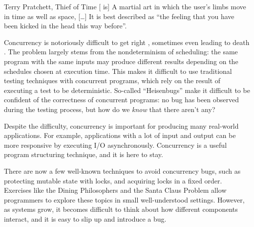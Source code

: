 \begin{chapquote}{Terry Pratchett, Thief of Time\nocite{pratchett2001}}
  [\dejafu{} is] A martial art in which the user's limbs move in time
  as well as space, [\ldots] It is best described as ``the feeling
  that you have been kicked in the head this way before''.
\end{chapquote}

Concurrency is notoriously difficult to get right \citep{overrated},
sometimes even leading to death \citep{therac25}. The problem largely
stems from the nondeterminism of scheduling: the same program with the
same inputs may produce different results depending on the schedules
chosen at execution time. This makes it difficult to use traditional
testing techniques with concurrent programs, which rely on the result
of executing a test to be deterministic. So-called ``Heisenbugs'' make
it difficult to be confident of the correctness of concurrent
programs: no bug has been observed during the testing process, but how
do we \emph{know} that there aren't any?

Despite the difficulty, concurrency is important for producing many
real-world applications. For example, applications with a lot of input
and output can be more responsive by executing I/O asynchronously.
Concurrency is a useful program structuring technique, and it is here
to stay.

There are now a few well-known techniques to avoid concurrency bugs,
such as protecting mutable state with locks, and acquiring locks in a
fixed order. Exercises like the Dining Philosophers
\citep{diningphilosophers} and the Santa Claus Problem
\citep{santaclaus} allow programmers to explore these topics in small
well-understood settings. However, as systems grow, it becomes
difficult to think about how different components interact, and it is
easy to slip up and introduce a bug.
